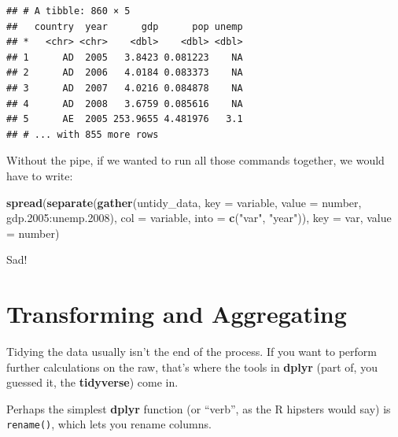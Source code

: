\documentclass[12pt,oneside,openany]{book}
\newenvironment{Shaded}{\begin{snugshade}}{\end{snugshade}}
\newcommand{\KeywordTok}[1]{\textcolor[rgb]{0.13,0.29,0.53}{\textbf{{#1}}}}
\newcommand{\DataTypeTok}[1]{\textcolor[rgb]{0.13,0.29,0.53}{{#1}}}
\newcommand{\FloatTok}[1]{\textcolor[rgb]{0.00,0.00,0.81}{{#1}}}
\newcommand{\StringTok}[1]{\textcolor[rgb]{0.31,0.60,0.02}{{#1}}}
\newcommand{\NormalTok}[1]{{#1}}
\begin{document}
\begin{verbatim}
## # A tibble: 860 × 5
##   country  year      gdp      pop unemp
## *   <chr> <chr>    <dbl>    <dbl> <dbl>
## 1      AD  2005   3.8423 0.081223    NA
## 2      AD  2006   4.0184 0.083373    NA
## 3      AD  2007   4.0216 0.084878    NA
## 4      AD  2008   3.6759 0.085616    NA
## 5      AE  2005 253.9655 4.481976   3.1
## # ... with 855 more rows
\end{verbatim}

Without the pipe, if we wanted to run all those commands together, we
would have to write:

\begin{Shaded}
\begin{Highlighting}[]
\KeywordTok{spread}\NormalTok{(}\KeywordTok{separate}\NormalTok{(}\KeywordTok{gather}\NormalTok{(untidy_data,}
                       \DataTypeTok{key =} \NormalTok{variable,}
                       \DataTypeTok{value =} \NormalTok{number,}
                       \NormalTok{gdp}\FloatTok{.2005}\NormalTok{:unemp}\FloatTok{.2008}\NormalTok{),}
                \DataTypeTok{col =} \NormalTok{variable,}
                \DataTypeTok{into =} \KeywordTok{c}\NormalTok{(}\StringTok{"var"}\NormalTok{, }\StringTok{"year"}\NormalTok{)),}
       \DataTypeTok{key =} \NormalTok{var,}
       \DataTypeTok{value =} \NormalTok{number)}
\end{Highlighting}
\end{Shaded}

Sad!

\section{Transforming and
Aggregating}\label{transforming-and-aggregating}

Tidying the data usually isn't the end of the process. If you want to
perform further calculations on the raw, that's where the tools in
\textbf{dplyr} (part of, you guessed it, the \textbf{tidyverse}) come
in.

Perhaps the simplest \textbf{dplyr} function (or ``verb'', as the R
hipsters would say) is \texttt{rename()}, which lets you rename columns.

\begin{Shaded}
\end{Shaded}
\end{document}
